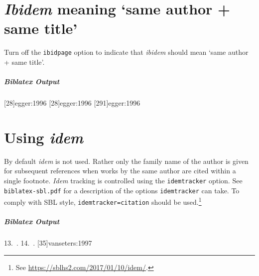 \documentclass[a4paper]{article}
\newenvironment{biboutput}{%
  \subparagraph{Biblatex Output}
}{\color{black}}
\begin{document}
\section*{\emph{Ibidem} meaning ‘same author + same title’}

Turn off the \texttt{ibidpage} option to indicate that \emph{ibidem} should
mean ‘same author + same title’.

\makeatletter
\blx@opt@loccittracker@false
\makeatother

\begin{biboutput}
  [28]{egger:1996}
  [28]{egger:1996}
  [291]{egger:1996}
\end{biboutput}

\section*{Using \emph{idem}}

By default \emph{idem} is not used. Rather only the family name of the author
is given for subsequent references when works by the same author are cited
within a single footnote. \emph{Idem} tracking is controlled using
the \texttt{idemtracker} option. See \texttt{biblatex-sbl.pdf} for a
description of the options \texttt{idemtracker} can take. To comply with SBL
style, \verb|idemtracker=citation| should be used.\footnote{See
\url{https://sblhs2.com/2017/01/10/idem/}.}

\begin{biboutput}
  \color{biblatex-colour}
  \hspace*{\bibindent}13.~\cites[35]{vanseters:1997}{vanseters:1995}.
  \color{black}
  \color{biblatex-colour}
  \hspace*{\bibindent}14.~\cites[35]{vanseters:1997}[222]{vanseters:1995}.
  \color{black}
  [35]{vanseters:1997}
\end{biboutput}

\printbibliography

\printindex
\end{document}

